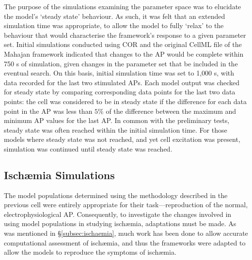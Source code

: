 \documentclass[../thesis-main.tex]{subfiles}
\begin{document}
The purpose of the simulations examining the parameter space was to elucidate the model's `steady state' behaviour. As such, it was felt that an extended simulation time was appropriate, to allow the model to fully `relax' to the behaviour that would characterise the framework's response to a given parameter set. Initial simulations conducted using COR and the original CellML file of the Mahajan framework indicated that changes to the AP would be complete within 750 s of simulation, given changes in the parameter set that be included in the eventual search. On this basis, initial simulation time was set to 1,000 s, with data recorded for the last two stimulated APs. Each model output was checked for steady state by comparing corresponding data points for the last two data points: the cell was considered to be in steady state if the difference for each data point in the AP was less than $5\%$ of the difference between the maximum and minimum AP values for the last AP. In common with the preliminary tests, steady state was often reached within the initial simulation time. For those models where steady state was not reached, and yet cell excitation was present, simulation was continued until steady state was reached.

\subsection{Isch\ae{}mia Simulations}
\label{subsec:isch-simulation}
The model populations determined using the methodology described in the previous cell were entirely appropriate for their task---reproduction of the normal, electrophysiological AP. Consequently, to investigate the changes involved in using model populations in studying isch\ae{}mia, adaptations must be made. As was mentioned in \S\ref{subsec:ischaemia}, much work has been done to allow accurate computational assessment of isch\ae{}mia, and thus the frameworks were adapted to allow the models to reproduce the symptoms of isch\ae{}mia.
\end{document}
